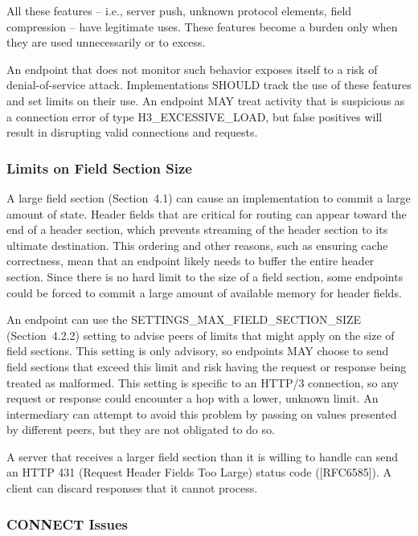 \documentclass{article}
\begin{document}
All these features -- i.e., server push, unknown protocol elements, field compression -- have legitimate uses.  These features become a burden only when they are used unnecessarily or to excess.

An endpoint that does not monitor such behavior exposes itself to a risk of denial-of-service attack.  Implementations SHOULD track the use of these features and set limits on their use.  An endpoint MAY treat activity that is suspicious as a connection error of type H3\_EXCESSIVE\_LOAD, but false positives will result in disrupting valid connections and requests.

\subsubsection{Limits on Field Section Size}

A large field section (Section~4.1) can cause an implementation to commit a large amount of state.  Header fields that are critical for routing can appear toward the end of a header section, which prevents streaming of the header section to its ultimate destination.  This ordering and other reasons, such as ensuring cache correctness, mean that an endpoint likely needs to buffer the entire header section. Since there is no hard limit to the size of a field section, some endpoints could be forced to commit a large amount of available memory for header fields.

An endpoint can use the SETTINGS\_MAX\_FIELD\_SECTION\_SIZE (Section~4.2.2) setting to advise peers of limits that might apply on the size of field sections.  This setting is only advisory, so endpoints MAY choose to send field sections that exceed this limit and risk having the request or response being treated as malformed. This setting is specific to an HTTP/3 connection, so any request or response could encounter a hop with a lower, unknown limit.  An intermediary can attempt to avoid this problem by passing on values presented by different peers, but they are not obligated to do so.

A server that receives a larger field section than it is willing to handle can send an HTTP 431 (Request Header Fields Too Large) status code ([RFC6585]).  A client can discard responses that it cannot process.

\subsubsection{CONNECT Issues}
\end{document}
